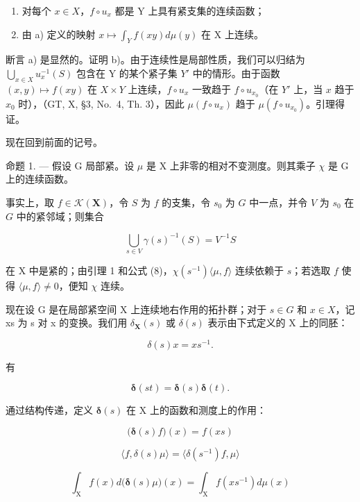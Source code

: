 \begin{enumerate}
\def\labelenumi{\alph{enumi})}
\tightlist
\item
  对每个 \(x \in X\)，\(f \circ u_{x}\) 都是 Y 上具有紧支集的连续函数；
\item
  由 a) 定义的映射 \(x \mapsto \int_{Y} f(xy) d\mu(y)\) 在 X 上连续。
\end{enumerate}

断言 a) 是显然的。证明 b)。由于连续性是局部性质，我们可以归结为 \(\bigcup_{x\in X}u_x^{-1}(S)\) 包含在 Y 的某个紧子集 \(Y'\) 中的情形。由于函数 \((x,y)\mapsto f(xy)\) 在 \(X\times Y\) 上连续，\(f\circ u_x\) 一致趋于 \(f\circ u_{x_0}\)（在 \(Y'\) 上，当 \(x\) 趋于 \(x_0\) 时），（GT, X, §3, No.~4, Th. 3），因此 \(\mu(f \circ u_x)\) 趋于 \(\mu(f \circ u_{x_0})\)。引理得证。

现在回到前面的记号。

命题 1. --- 假设 G 局部紧。设 \(\mu\) 是 X 上非零的相对不变测度。则其乘子 \(\chi\) 是 G 上的连续函数。

事实上，取 \(f \in \mathcal{K}(\mathbf{X})\)，令 \(S\) 为 \(f\) 的支集，令 \(s_0\) 为 \(G\) 中一点，并令 \(V\) 为 \(s_0\) 在 \(G\) 中的紧邻域；则集合

\[
\bigcup_ {s \in V} \gamma (s) ^ {- 1} (S) = V ^ {- 1} S
\]

在 X 中是紧的；由引理 1 和公式 (8)，\(\chi(s^{-1})\langle\mu, f\rangle\) 连续依赖于 \(s\)；若选取 \(f\) 使得 \(\langle\mu, f\rangle \neq 0\)，便知 \(\chi\) 连续。

现在设 G 是在局部紧空间 X 上连续地右作用的拓扑群；对于 \(s \in G\) 和 \(x \in X\)，记 xs 为 s 对 x 的变换。我们用 \(\delta_{\mathbf{X}}(s)\) 或 \(\delta(s)\) 表示由下式定义的 X 上的同胚：

\[
\delta (s) x = x s ^ {- 1}.\tag{1'}
\]

有

\[
\boldsymbol {\delta} (s t) = \boldsymbol {\delta} (s) \boldsymbol {\delta} (t).\tag{2'}
\]

通过结构传递，定义 \(\boldsymbol{\delta}(s)\) 在 X 上的函数和测度上的作用：



\[
\big (\boldsymbol {\delta} (s) f \big) (x) = f (x s)\tag{3'}
\]

\[
\langle f, \delta (s) \mu \rangle = \langle \delta (s ^ {- 1}) f, \mu \rangle\tag{4'}
\]

\[
\int_ {\mathrm{X}} f (x) d \bigl (\pmb {\delta} (s) \mu \bigr) (x) = \int_ {\mathrm{X}} f (x s ^ {- 1}) d \mu (x)\tag{5'}
\]

